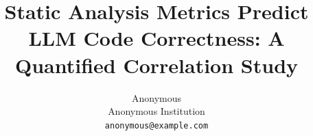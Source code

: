 \documentclass[letterpaper]{article}
\title{Static Analysis Metrics Predict LLM Code Correctness: A Quantified Correlation Study}
\author{
  Anonymous \\
  Anonymous Institution \\
  \texttt{anonymous@example.com}
}
\date{}
\begin{document}
\maketitle

\begin{abstract}

\end{abstract}











\end{document}
